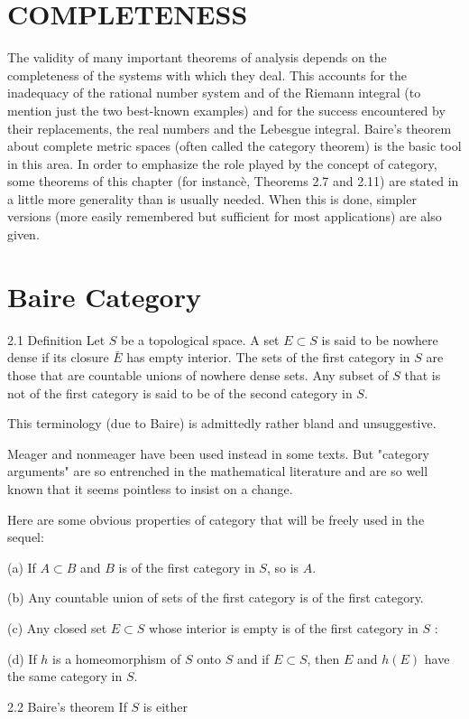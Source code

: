 \documentclass[10pt]{article}
\begin{document}
\section{COMPLETENESS}
The validity of many important theorems of analysis depends on the completeness of the systems with which they deal. This accounts for the inadequacy of the rational number system and of the Riemann integral (to mention just the two best-known examples) and for the success encountered by their replacements, the real numbers and the Lebesgue integral. Baire's theorem about complete metric spaces (often called the category theorem) is the basic tool in this area. In order to emphasize the role played by the concept of category, some theorems of this chapter (for instancè, Theorems 2.7 and 2.11) are stated in a little more generality than is usually needed. When this is done, simpler versions (more easily remembered but sufficient for most applications) are also given.

\section{Baire Category}
2.1 Definition Let $S$ be a topological space. A set $E \subset S$ is said to be nowhere dense if its closure $\bar{E}$ has empty interior. The sets of the first category in $S$ are those that are countable unions of nowhere dense sets. Any subset of $S$ that is not of the first category is said to be of the second category in $S$.

This terminology (due to Baire) is admittedly rather bland and unsuggestive.

Meager and nonmeager have been used instead in some texts. But "category arguments" are so entrenched in the mathematical literature and are so well known that it seems pointless to insist on a change.

Here are some obvious properties of category that will be freely used in the sequel:

(a) If $A \subset B$ and $B$ is of the first category in $S$, so is $A$.

(b) Any countable union of sets of the first category is of the first category.

(c) Any closed set $E \subset S$ whose interior is empty is of the first category in $S$ :

(d) If $h$ is a homeomorphism of $S$ onto $S$ and if $E \subset S$, then $E$ and $h(E)$ have the same category in $S$.

2.2 Baire's theorem If $S$ is either
\end{document}
